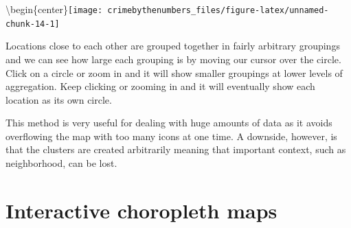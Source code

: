 \documentclass[
]{krantz}
\makeatletter
\newenvironment{Shaded}{\begin{snugshade}}{\end{snugshade}}
\newcommand{\AttributeTok}[1]{\textcolor[rgb]{0.61,0.61,0.61}{#1}}
\newcommand{\DecValTok}[1]{\textcolor[rgb]{0.06,0.06,0.06}{#1}}
\newcommand{\FunctionTok}[1]{\textcolor[rgb]{0,0,0}{#1}}
\newcommand{\NormalTok}[1]{#1}
\newcommand{\SpecialCharTok}[1]{\textcolor[rgb]{0,0,0}{#1}}
\newcommand{\StringTok}[1]{\textcolor[rgb]{0.5,0.5,0.5}{#1}}
\newenvironment{kframe}{%
\medskip{}
\setlength{\fboxsep}{.8em}
 \def\at@end@of@kframe{}%
 \ifinner\ifhmode%
  \def\at@end@of@kframe{\end{minipage}}%
  \begin{minipage}{\columnwidth}%
 \fi\fi%
 \def\FrameCommand##1{\hskip\@totalleftmargin \hskip-\fboxsep
 \colorbox{shadecolor}{##1}\hskip-\fboxsep
     \hskip-\linewidth \hskip-\@totalleftmargin \hskip\columnwidth}%
 \MakeFramed {\advance\hsize-\width
   \@totalleftmargin\z@ \linewidth\hsize
   \@setminipage}}%
 {\par\unskip\endMakeFramed%
 \at@end@of@kframe}
\renewenvironment{Shaded}{\begin{kframe}}{\end{kframe}}
\makeatother
\begin{document}
\begin{Shaded}
\end{Shaded}

\textbackslash begin\{center\}\texttt{[image: crimebythenumbers\_files/figure-latex/unnamed-chunk-14-1]}

Locations close to each other are grouped together in fairly arbitrary groupings and we can see how large each grouping is by moving our cursor over the circle. Click on a circle or zoom in and it will show smaller groupings at lower levels of aggregation. Keep clicking or zooming in and it will eventually show each location as its own circle.

This method is very useful for dealing with huge amounts of data as it avoids overflowing the map with too many icons at one time. A downside, however, is that the clusters are created arbitrarily meaning that important context, such as neighborhood, can be lost.

\hypertarget{interactive-choropleth-maps}{%
\section{Interactive choropleth maps}\label{interactive-choropleth-maps}}
\end{document}
